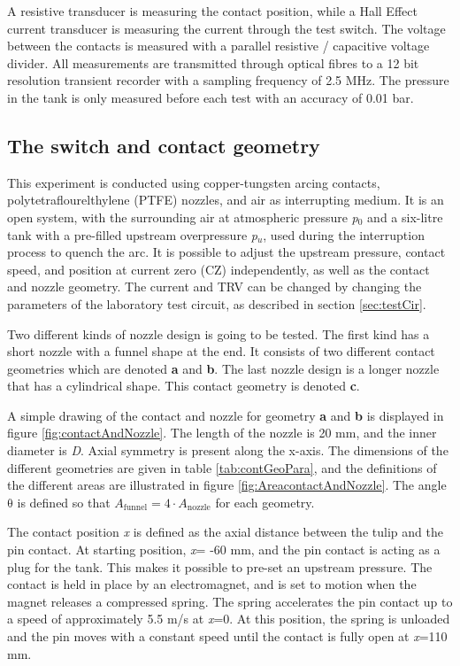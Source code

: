 \documentclass[10pt,b5paper,twoside]{article}
\begin{document}
A resistive transducer is measuring the contact position, while a Hall Effect current transducer is measuring the current through the test switch. The voltage between the contacts is measured with a parallel resistive / capacitive voltage divider. All measurements are transmitted through optical fibres to a 12 bit resolution transient recorder with a sampling frequency of 2.5 MHz. The pressure in the tank is only measured before each test with an accuracy of 0.01 bar.

\subsection{The switch and contact geometry}
This experiment is conducted using copper-tungsten arcing contacts, polytetraflourelthylene (PTFE) nozzles, and air as interrupting medium. It is an open system, with the surrounding air at atmospheric pressure \textit{p$_0$} and a six-litre tank with a pre-filled upstream overpressure \textit{p$_u$}, used during the interruption process to quench the arc. It is possible to adjust the upstream pressure, contact speed, and position at current zero (CZ) independently, as well as the contact and nozzle geometry. The current and TRV can be changed by changing the parameters of the laboratory test circuit, as described in section \ref{sec:testCir}.

Two different kinds of nozzle design is going to be tested. The first kind has a short nozzle with a funnel shape at the end. It consists of two different contact geometries which are denoted \textbf{a} and \textbf{b}. The last nozzle design is a longer nozzle that has a cylindrical shape. This contact geometry is denoted \textbf{c}. 

A simple drawing of the contact and nozzle for geometry \textbf{a} and \textbf{b} is displayed in figure \ref{fig:contactAndNozzle}. The length of the nozzle is 20 mm, and the inner diameter is \textit{D}. Axial symmetry is present along the x-axis. The dimensions of the different geometries are given in table \ref{tab:contGeoPara}, and the definitions of the different areas are illustrated in figure \ref{fig:AreacontactAndNozzle}. The angle $\mathrm{\theta}$ is defined so that $A_\mathrm{{funnel}}=4 \cdot A_\mathrm{{nozzle}}$ for each geometry.

The contact position \textit{x} is defined as the axial distance between the tulip and the pin contact. At starting position, \textit{x}= -60 mm, and the pin contact is acting as a plug for the tank. This makes it possible to pre-set an upstream pressure. The contact is held in place by an electromagnet, and is set to motion when the magnet releases a compressed spring. The spring accelerates the pin contact up to a speed of approximately 5.5 m/s at \textit{x}=0. At this position, the spring is unloaded and the pin moves with a constant speed until the contact is fully open at \textit{x}=110 mm.
\end{document}
